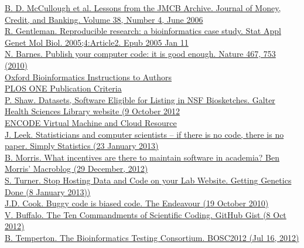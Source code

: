 \documentclass[slidestop]{beamer}
\begin{document}
\begin{frame}
{    \href{https://www.zotero.org/scottbot/items/itemKey/GCQEH25G}{B. D. McCullough et al. Lessons from the JMCB Archive. Journal of Money, Credit, and Banking. Volume 38, Number 4, June 2006}\\
    \href{http://www.ncbi.nlm.nih.gov/pubmed/16646837}{R. Gentleman. Reproducible research: a bioinformatics case study. Stat Appl Genet Mol Biol. 2005;4:Article2. Epub 2005 Jan 11}\\
    \href{http://www.nature.com/news/2010/101013/full/467753a.html}{N. Barnes. Publish your computer code: it is good enough. Nature 467, 753 (2010)}\\
    \href{http://www.oxfordjournals.org/our_journals/bioinformatics/for_authors/general.html}{Oxford Bioinformatics Instructions to Authors}\\
    \href{http://www.plosone.org/static/publication}{PLOS ONE Publication Criteria}\\
    \href{http://www.galter.northwestern.edu/news/index.cfm/2012/10/9/Datasets-Software-Eligible-for-Listing-in-NSF-Biosketches}{P. Shaw. Datasets, Software Eligible for Listing in NSF Biosketches. Galter Health Sciences Library website (9 October 2012}\\
    \href{http://scofield.bx.psu.edu/~dannon/encodevm/}{ENCODE Virtual Machine and Cloud Resource}\\
    \href{http://simplystatistics.org/2013/01/23/statisticians-and-computer-scientists-if-there-is-no-code-there-is-no-paper/}{J. Leek. Statisticians and computer scientists -- if there is no code, there is no paper. Simply Statistics (23 January 2013)}\\
    \href{http://www.bendmorris.com/2012/12/what-incentives-are-there-to-maintain.html}{B. Morris. What incentives are there to maintain software in academia? Ben Morris' Macroblog (29 December, 2012)}\\
    \href{http://gettinggeneticsdone.blogspot.nl/2013/01/stop-hosting-data-and-code-on-your-lab.html}{S. Turner. Stop Hosting Data and Code on your Lab Website. Getting Genetics Done (8 January 2013))}\\
    \href{http://www.johndcook.com/blog/2010/10/19/buggy-simulation-code-is-biased/}{J.D. Cook. Buggy code is biased code. The Endeavour (19 October 2010)}\\
    \href{https://gist.github.com/3311557}{V. Buffalo. The Ten Commandments of Scientific Coding. GitHub Gist (8 Oct 2012)}\\
    \href{http://www.slideshare.net/jandot/b-temperton-the-bioinformatics-testing-consortium}{B. Temperton. The Bioinformatics Testing Consortium. BOSC2012 (Jul 16, 2012)}\\
}
\end{frame}
\end{document}
